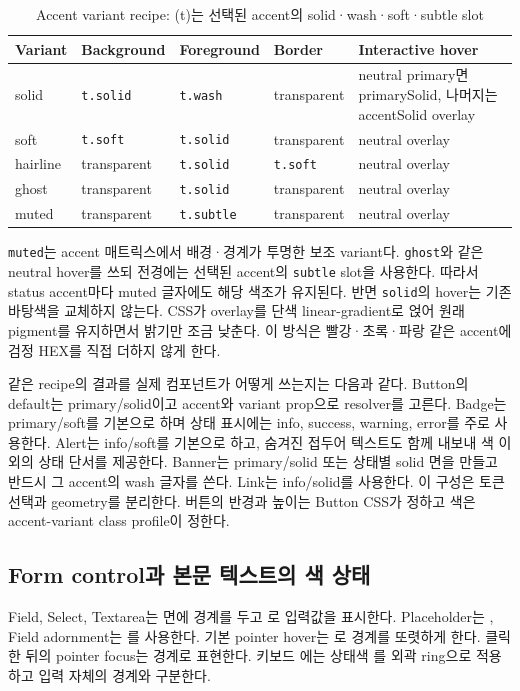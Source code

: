 \documentclass[11pt,titlepage]{article}
\begin{document}
\begin{table}[htbp]
\centering
\caption{Accent variant recipe: (t)는 선택된 accent의 solid·wash·soft·subtle slot}
\label{tab:variant-recipes}
\small
\begin{tabularx}{\textwidth}{@{}l X X X X@{}}
\toprule
Variant & Background & Foreground & Border & Interactive hover \\
\midrule
solid & \texttt{t.solid} & \texttt{t.wash} & transparent & neutral primary면 primarySolid, 나머지는 accentSolid overlay \\
soft & \texttt{t.soft} & \texttt{t.solid} & transparent & neutral overlay \\
hairline & transparent & \texttt{t.solid} & \texttt{t.soft} & neutral overlay \\
ghost & transparent & \texttt{t.solid} & transparent & neutral overlay \\
muted & transparent & \texttt{t.subtle} & transparent & neutral overlay \\
\bottomrule
\end{tabularx}
\end{table}

\texttt{muted}는 accent 매트릭스에서 배경·경계가 투명한 보조 variant다. \texttt{ghost}와 같은 neutral hover를 쓰되 전경에는 선택된 accent의 \texttt{subtle} slot을 사용한다. 따라서 status accent마다 muted 글자에도 해당 색조가 유지된다. 반면 \texttt{solid}의 hover는 기존 바탕색을 교체하지 않는다. CSS가 overlay를 단색 linear-gradient로 얹어 원래 pigment를 유지하면서 밝기만 조금 낮춘다. 이 방식은 빨강·초록·파랑 같은 accent에 검정 HEX를 직접 더하지 않게 한다.

같은 recipe의 결과를 실제 컴포넌트가 어떻게 쓰는지는 다음과 같다. Button의 default는 primary/solid이고 accent와 variant prop으로 resolver를 고른다. Badge는 primary/soft를 기본으로 하며 상태 표시에는 info, success, warning, error를 주로 사용한다. Alert는 info/soft를 기본으로 하고, 숨겨진 접두어 텍스트도 함께 내보내 색 이외의 상태 단서를 제공한다. Banner는 primary/solid 또는 상태별 solid 면을 만들고 반드시 그 accent의 wash 글자를 쓴다. Link는 info/solid를 사용한다. 이 구성은 토큰 선택과 geometry를 분리한다. 버튼의 반경과 높이는 Button CSS가 정하고 색은 accent-variant class profile이 정한다.

\subsection{Form control과 본문 텍스트의 색 상태}

Field, Select, Textarea는  면에  경계를 두고 로 입력값을 표시한다. Placeholder는 , Field adornment는 를 사용한다. 기본 pointer hover는 로 경계를 또렷하게 한다. 클릭한 뒤의 pointer focus는  경계로 표현한다. 키보드 에는 상태색 를 외곽 ring으로 적용하고 입력 자체의 경계와 구분한다.
\end{document}
